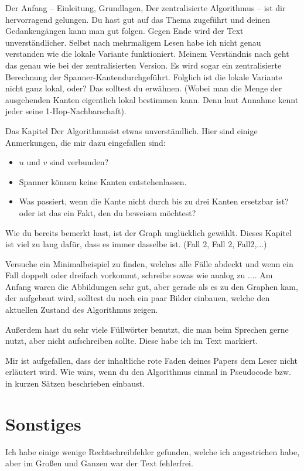 \documentclass[a4paper,twoside]{IEEEtran}
\begin{document}
Der Anfang -- Einleitung, Grundlagen, Der zentralisierte Algorithmus -- ist dir hervorragend gelungen.
Du hast gut auf das Thema zugeführt und deinen Gedankengängen kann man gut folgen.
Gegen Ende wird der Text unverständlicher. 
Selbst nach mehrmaligem Lesen habe ich nicht genau verstanden wie die lokale Variante funktioniert.
Meinem Verständnis nach geht das genau wie bei der zentralisierten Version.
Es wird sogar ein \glqq zentralisierte Berechnung der Spanner-Kanten\grqq \space durchgeführt.
Folglich ist die lokale Variante nicht ganz lokal, oder?
Das solltest du erwähnen.
(Wobei man die Menge der ausgehenden Kanten eigentlich lokal bestimmen kann.
Denn laut Annahme kennt jeder seine 1-Hop-Nachbarschaft).

Das Kapitel \glqq Der Algorithmus\grqq \space ist etwas unverständlich. 
Hier sind einige Anmerkungen, die mir dazu eingefallen sind:
\begin{itemize}
\item $u $ und $v $ sind verbunden?
\item Spanner können keine Kanten  \glqq entstehen\grqq \space lassen.
\item Was passiert, wenn die Kante nicht \glqq \space durch bis zu drei Kanten ersetzbar ist?\grqq oder ist das ein Fakt, den du beweisen möchtest?
\end{itemize}

Wie du bereits bemerkt hast, ist der Graph unglücklich gewählt.
Dieses Kapitel ist viel zu lang dafür, dass es immer dasselbe ist. (Fall 2, Fall 2, Fall2,...)

Versuche ein Minimalbeispiel zu finden, welches alle Fälle abdeckt und wenn ein Fall doppelt oder dreifach vorkommt, schreibe sowas wie \glqq analog zu ...\grqq. \space
Am Anfang waren die Abbildungen sehr gut, aber gerade als es zu den Graphen kam, der aufgebaut wird, solltest du noch ein paar Bilder einbauen, welche den aktuellen Zustand des Algorithmus zeigen.


Außerdem hast du sehr viele Füllwörter benutzt, die man beim Sprechen gerne nutzt, aber nicht aufschreiben sollte.
Diese habe ich im Text markiert.

Mir ist aufgefallen, dass der inhaltliche rote Faden deines Papers dem Leser nicht erläutert wird.
Wie wärs, wenn du den Algorithmus einmal in Pseudocode bzw. in kurzen Sätzen beschrieben einbaust.





\section{Sonstiges}
Ich habe einige wenige Rechtschreibfehler gefunden, welche ich angestrichen habe, aber im Großen und Ganzen war der Text fehlerfrei.
\end{document}
